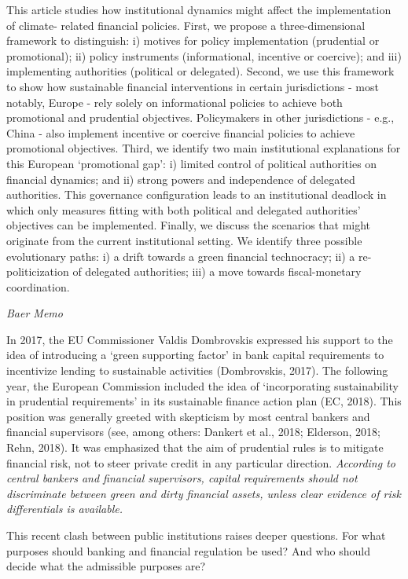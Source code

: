 \documentclass[
]{book}
\begin{document}
This article studies how institutional dynamics might affect the implementation of climate-
related financial policies. First, we propose a three-dimensional framework to distinguish: i)
motives for policy implementation (prudential or promotional); ii) policy instruments
(informational, incentive or coercive); and iii) implementing authorities (political or
delegated). Second, we use this framework to show how sustainable financial interventions in
certain jurisdictions - most notably, Europe - rely solely on informational policies to achieve
both promotional and prudential objectives. Policymakers in other jurisdictions - e.g., China -
also implement incentive or coercive financial policies to achieve promotional objectives.
Third, we identify two main institutional explanations for this European `promotional gap': i)
limited control of political authorities on financial dynamics; and ii) strong powers and
independence of delegated authorities. This governance configuration leads to an institutional
deadlock in which only measures fitting with both political and delegated authorities'
objectives can be implemented. Finally, we discuss the scenarios that might originate from the
current institutional setting. We identify three possible evolutionary paths: i) a drift towards a
green financial technocracy; ii) a re-politicization of delegated authorities; iii) a move towards
fiscal-monetary coordination.

\emph{Baer Memo}

In 2017, the EU Commissioner Valdis Dombrovskis expressed his support to the idea of
introducing a `green supporting factor' in bank capital requirements to incentivize lending to
sustainable activities (Dombrovskis, 2017). The following year, the European Commission
included the idea of `incorporating sustainability in prudential requirements' in its sustainable
finance action plan (EC, 2018). This position was generally greeted with skepticism by most
central bankers and financial supervisors (see, among others: Dankert et al., 2018; Elderson,
2018; Rehn, 2018). It was emphasized that the aim of prudential rules is to mitigate financial
risk, not to steer private credit in any particular direction. \emph{According to central bankers and
financial supervisors, capital requirements should not discriminate between green and dirty
financial assets, unless clear evidence of risk differentials is available.}

This recent clash between public institutions raises deeper questions. For what purposes should
banking and financial regulation be used? And who should decide what the admissible
purposes are?
\end{document}
